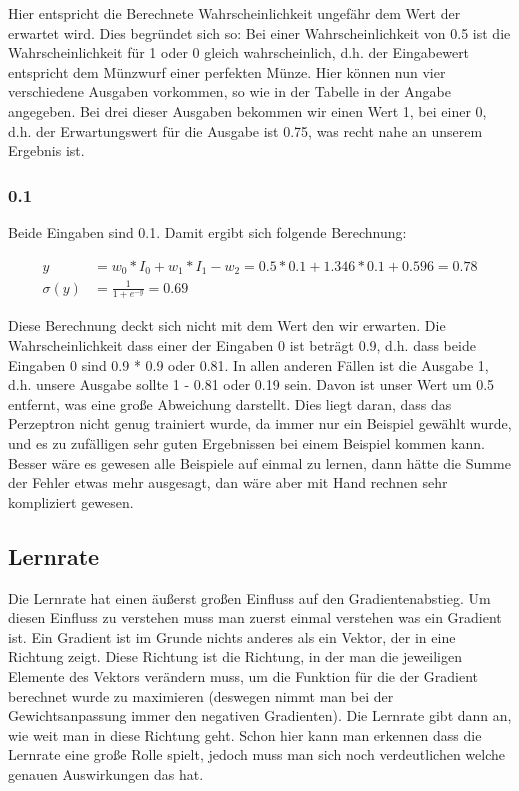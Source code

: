 \documentclass[a4paper]{article}
\begin{document}
Hier entspricht die Berechnete Wahrscheinlichkeit ungefähr dem Wert der erwartet wird. Dies begründet sich so: Bei einer Wahrscheinlichkeit von 0.5 ist die Wahrscheinlichkeit für 1 oder 0 gleich wahrscheinlich, d.h. der Eingabewert entspricht dem Münzwurf einer perfekten Münze. Hier können nun vier verschiedene Ausgaben vorkommen, so wie in der Tabelle in der Angabe angegeben. Bei drei dieser Ausgaben bekommen wir einen Wert 1, bei einer 0, d.h. der Erwartungswert für die Ausgabe ist 0.75, was recht nahe an unserem Ergebnis ist.

\subsubsection{0.1}
Beide Eingaben sind 0.1. Damit ergibt sich folgende Berechnung:

\begin{align*}
	y &= w_0 * I_0 + w_1 * I_1 - w_2 = 0.5 * 0.1 + 1.346 * 0.1 + 0.596 = 0.78 \\
	\sigma(y) &= \frac{1}{1 + e^{-y}} = 0.69
\end{align*}

Diese Berechnung deckt sich nicht mit dem Wert den wir erwarten. Die Wahrscheinlichkeit dass einer der Eingaben 0 ist beträgt 0.9, d.h. dass beide Eingaben 0 sind 0.9 * 0.9 oder 0.81. In allen anderen Fällen ist die Ausgabe 1, d.h. unsere Ausgabe sollte 1 - 0.81 oder 0.19 sein. Davon ist unser Wert um 0.5 entfernt, was eine große Abweichung darstellt. Dies liegt daran, dass das Perzeptron nicht genug trainiert wurde, da immer nur ein Beispiel gewählt wurde, und es zu zufälligen sehr guten Ergebnissen bei einem Beispiel kommen kann. Besser wäre es gewesen alle Beispiele auf einmal zu lernen, dann hätte die Summe der Fehler etwas mehr ausgesagt, dan wäre aber mit Hand rechnen sehr kompliziert gewesen.

\subsection{Lernrate}
Die Lernrate hat einen äußerst großen Einfluss auf den Gradientenabstieg. Um diesen Einfluss zu verstehen muss man zuerst einmal verstehen was ein Gradient ist. Ein Gradient ist im Grunde nichts anderes als ein Vektor, der in eine Richtung zeigt. Diese Richtung ist die Richtung, in der man die jeweiligen Elemente des Vektors verändern muss, um die Funktion für die der Gradient berechnet wurde zu maximieren (deswegen nimmt man bei der Gewichtsanpassung immer den negativen Gradienten). Die Lernrate gibt dann an, wie weit man in diese Richtung geht. Schon hier kann man erkennen dass die Lernrate eine große Rolle spielt, jedoch muss man sich noch verdeutlichen welche genauen Auswirkungen das hat.
\end{document}
